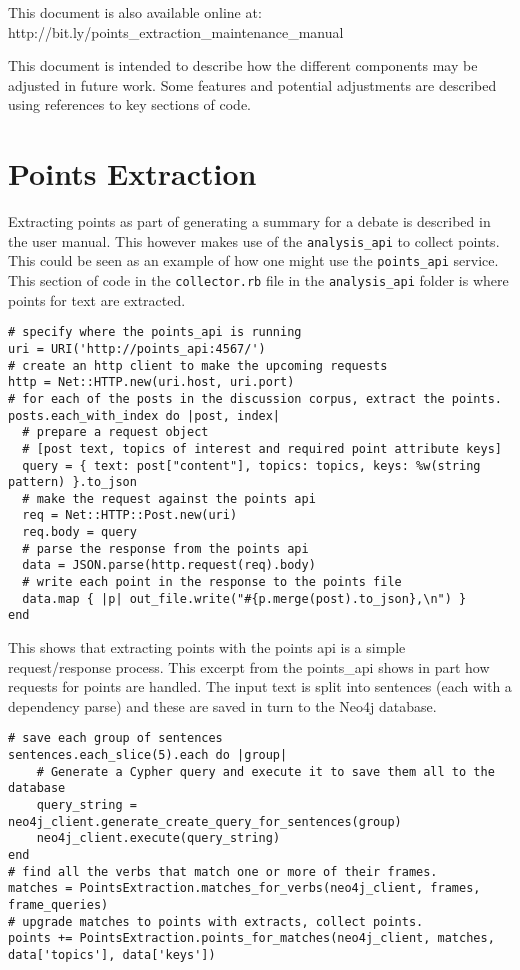 This document is also available online at: \\ http://bit.ly/points\_extraction\_maintenance\_manual

\noindent\hrulefill

\noindent This document is intended to describe how the different components may
be adjusted in future work. Some features and potential adjustments are
described using references to key sections of code.

\section{Points Extraction}

Extracting points as part of generating a summary for a debate is
described in the user manual. This however makes use of the
\texttt{analysis\_api} to collect points. This could be seen as
an example of how one might use the \texttt{points\_api} service. This
section of code in the \texttt{collector.rb} file in the
\texttt{analysis\_api} folder is where points for text are extracted.

\begin{verbatim}
# specify where the points_api is running
uri = URI('http://points_api:4567/')
# create an http client to make the upcoming requests
http = Net::HTTP.new(uri.host, uri.port)
# for each of the posts in the discussion corpus, extract the points.
posts.each_with_index do |post, index|
  # prepare a request object
  # [post text, topics of interest and required point attribute keys]
  query = { text: post["content"], topics: topics, keys: %w(string pattern) }.to_json
  # make the request against the points api
  req = Net::HTTP::Post.new(uri)
  req.body = query
  # parse the response from the points api
  data = JSON.parse(http.request(req).body)
  # write each point in the response to the points file
  data.map { |p| out_file.write("#{p.merge(post).to_json},\n") }
end
\end{verbatim}

This shows that extracting points with the points api is a simple
request/response process. This excerpt from the points\_api shows in
part how requests for points are handled. The input text is split into
sentences (each with a dependency parse) and these are saved in turn to
the Neo4j database.

\begin{verbatim}
# save each group of sentences
sentences.each_slice(5).each do |group|
    # Generate a Cypher query and execute it to save them all to the database
    query_string = neo4j_client.generate_create_query_for_sentences(group)
    neo4j_client.execute(query_string)
end
# find all the verbs that match one or more of their frames.
matches = PointsExtraction.matches_for_verbs(neo4j_client, frames, frame_queries)
# upgrade matches to points with extracts, collect points.
points += PointsExtraction.points_for_matches(neo4j_client, matches, data['topics'], data['keys'])
\end{verbatim}

